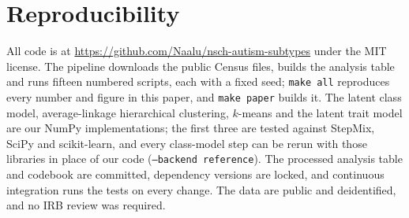 \section{Reproducibility}
\label{sec:repro}
All code is at \url{https://github.com/Naalu/nsch-autism-subtypes} under the MIT license. The pipeline downloads the public Census files, builds the analysis table and runs fifteen numbered scripts, each with a fixed seed; \texttt{make all} reproduces every number and figure in this paper, and \texttt{make paper} builds it. The latent class model, average-linkage hierarchical clustering, $k$-means and the latent trait model are our NumPy implementations; the first three are tested against StepMix, SciPy and scikit-learn, and every class-model step can be rerun with those libraries in place of our code (\texttt{--backend reference}). The processed analysis table and codebook are committed, dependency versions are locked, and continuous integration runs the tests on every change. The data are public and deidentified, and no IRB review was required.

